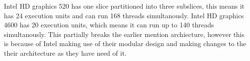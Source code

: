 Intel HD graphics 520 has one slice partitioned into three subslices, this means it has 24 execution units and can run 168 threads simultanously.
Intel HD graphics 4600 has 20 execution units, which means it can run up to 140 threads simultanously. 
This partially breaks the earlier mention archiecture, however this is because of Intel making use of their modular design and making changes to the their architecture as they have need of it.
